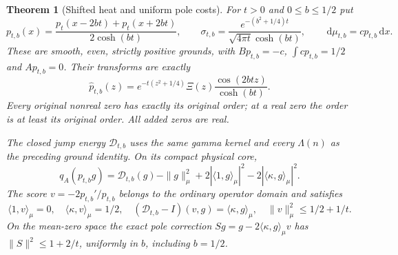 \documentclass[11pt]{article}
\newtheorem{theorem}{Theorem}
\theoremstyle{remark}\newtheorem{remark}[theorem]{Remark}
\newcommand{\dd}{\,\mathrm d}
\begin{document}
\begin{theorem}[Shifted heat and uniform pole costs]
\label{thm:shifted-heat-ground}
For $t>0$ and $0\le b\le1/2$ put
\[
 p_{t,b}(x)=\frac{p_t(x-2bt)+p_t(x+2bt)}{2\cosh(bt)},
 \qquad
 \sigma_{t,b}=\frac{e^{-(b^2+1/4)t}}
                    {\sqrt{4\pi t}\cosh(bt)},\qquad
 \dd\mu_{t,b}=cp_{t,b}\dd x.                         \tag{SHG1}
\]
These are smooth, even, strictly positive grounds, with
$Bp_{t,b}=-c$, $\int cp_{t,b}=1/2$ and $Ap_{t,b}=0$.
Their transforms are exactly
\[
 \widehat p_{t,b}(z)
 =e^{-t(z^2+1/4)}\Xi(z)\frac{\cos(2btz)}{\cosh(bt)}. \tag{SHG2}
\]
Every original nonreal zero has exactly its original order;
at a real zero the order is at least its original order.
All added zeros are real.

The closed jump energy $\mathcal D_{t,b}$ uses the same gamma
kernel and every $\Lambda(n)$ as the preceding ground identity.
On its compact physical core,
\[
 q_A(p_{t,b}g)=\mathcal D_{t,b}(g)-\|g\|_\mu^2+
             2|\langle1,g\rangle_\mu|^2-
             2|\langle\kappa,g\rangle_\mu|^2.       \tag{SHG3}
\]
The score $v=-2p_{t,b}'/p_{t,b}$ belongs to the ordinary
operator domain and satisfies
\[
 \langle1,v\rangle_\mu=0,\quad
 \langle\kappa,v\rangle_\mu=1/2,\quad
 (\mathcal D_{t,b}-I)(v,g)=\langle\kappa,g\rangle_\mu,\quad
 \|v\|_\mu^2\le1/2+1/t.                            \tag{SHG4}
\]
On the mean-zero space the exact pole correction
$Sg=g-2\langle\kappa,g\rangle_\mu v$ has
$\|S\|^2\le1+2/t$, uniformly in $b$, including $b=1/2$.
\end{theorem}
\end{document}
